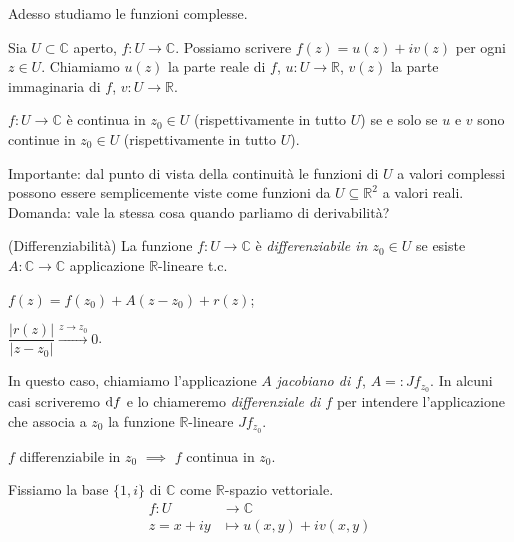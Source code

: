 Adesso studiamo le funzioni complesse.

Sia $U \subset \mathbb{C}$ aperto, $f:U \longrightarrow \mathbb{C}$. Possiamo scrivere $f(z)=u(z)+iv(z)$ per ogni $z \in U$. Chiamiamo $u(z)$ la parte reale di $f$, $u:U \longrightarrow \mathbb{R}$, $v(z)$ la parte immaginaria di $f$, $v:U \longrightarrow \mathbb{R}$.

\begin{ftt}
  $f:U \longrightarrow \mathbb{C}$ è continua in $z_0 \in U$ (rispettivamente in tutto $U$) se e solo se $u$ e $v$ sono continue in $z_0 \in U$ (rispettivamente in tutto $U$).
\end{ftt}

Importante: dal punto di vista della continuità le funzioni di $U$ a valori complessi possono essere semplicemente viste come funzioni da $U \subseteq \mathbb{R}^2$ a valori reali. Domanda: vale la stessa cosa quando parliamo di derivabilità?

\begin{defn}
  (Differenziabilità) La funzione $f:U \longrightarrow \mathbb{C}$ è \textit{differenziabile in $z_0 \in U$} se esiste $A:\mathbb{C} \longrightarrow \mathbb{C}$ applicazione $\mathbb{R}$-lineare t.c.
  \begin{nlist}
    \item $f(z)=f(z_0)+A(z-z_0)+r(z)$;
    \item $\dfrac{|r(z)|}{|z-z_0|} \xrightarrow[]{z \longrightarrow z_0} 0$.
  \end{nlist}
  In questo caso, chiamiamo l'applicazione $A$ \textit{jacobiano di $f$}, $A=: Jf_{z_0}$. In alcuni casi scriveremo $\mathop{}\!\mathrm{d} f$ e lo chiameremo \textit{differenziale di $f$} per intendere l'applicazione che associa a $z_0$ la funzione $\mathbb{R}$-lineare $Jf_{z_0}$.
\end{defn}

\begin{oss}
  $f$ differenziabile in $z_0$ $\implies$ $f$ continua in $z_0$.
\end{oss}

Fissiamo la base $\{1, i\}$ di $\mathbb{C}$ come $\mathbb{R}$-spazio vettoriale.
\begin{align*}
  f:U &\longrightarrow \mathbb{C}\\
  z=x+iy &\longmapsto u(x, y)+iv(x, y)
\end{align*}

